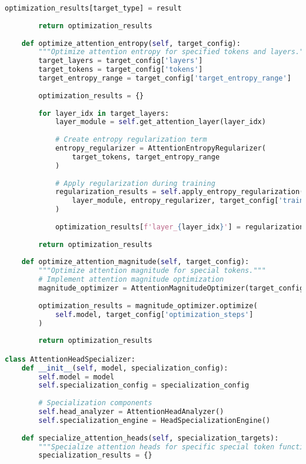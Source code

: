 \begin{lstlisting}[language=Python, caption=Attention pattern analysis and optimization framework]
            optimization_results[target_type] = result
        
        return optimization_results
    
    def optimize_attention_entropy(self, target_config):
        """Optimize attention entropy for specified tokens and layers."""
        target_layers = target_config['layers']
        target_tokens = target_config['tokens']
        target_entropy_range = target_config['target_entropy_range']
        
        optimization_results = {}
        
        for layer_idx in target_layers:
            layer_module = self.get_attention_layer(layer_idx)
            
            # Create entropy regularization term
            entropy_regularizer = AttentionEntropyRegularizer(
                target_tokens, target_entropy_range
            )
            
            # Apply regularization during training
            regularization_results = self.apply_entropy_regularization(
                layer_module, entropy_regularizer, target_config['training_steps']
            )
            
            optimization_results[f'layer_{layer_idx}'] = regularization_results
        
        return optimization_results
    
    def optimize_attention_magnitude(self, target_config):
        """Optimize attention magnitude for special tokens."""
        # Implement attention magnitude optimization
        magnitude_optimizer = AttentionMagnitudeOptimizer(target_config)
        
        optimization_results = magnitude_optimizer.optimize(
            self.model, target_config['optimization_steps']
        )
        
        return optimization_results

class AttentionHeadSpecializer:
    def __init__(self, model, specialization_config):
        self.model = model
        self.specialization_config = specialization_config
        
        # Specialization components
        self.head_analyzer = AttentionHeadAnalyzer()
        self.specialization_engine = HeadSpecializationEngine()
        
    def specialize_attention_heads(self, specialization_targets):
        """Specialize attention heads for specific special token functions."""
        specialization_results = {}
        

\end{lstlisting}
